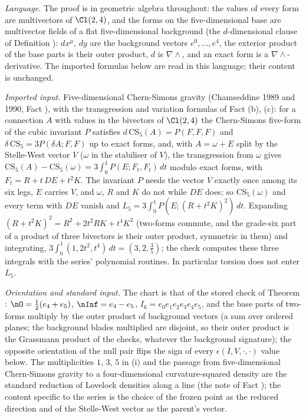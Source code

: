 \emph{Language.} The proof is in geometric algebra throughout: the values of every form are multivectors of $\Cl(2,4)$, and the forms on the five-dimensional base are multivector fields of a flat five-dimensional background (the $d$-dimensional clause of Definition ): $dx^{\mu}$, $dy$ are the background vectors $e^{0}, \dots, e^{4}$, the exterior product of the base parts is their outer product, $d$ is $\nabla \wedge$, and an exact form is a $\nabla \wedge$-derivative. The imported formulas below are read in this language; their content is unchanged.

\emph{Imported input.} Five-dimensional Chern-Simons gravity (Chamseddine 1989 and 1990, Fact ), with the transgression and variation formulas of Fact (b), (c): for a connection $A$ with values in the bivectors of $\Cl(2,4)$ the Chern-Simons five-form of the cubic invariant $P$ satisfies $d\,\mathrm{CS}_{5}(A) = P(F, F, F)$ and $\delta\,\mathrm{CS}_{5} = 3P(\delta A; F, F)$ up to exact forms, and, with $A = \omega + E$ split by the Stelle-West vector $V$ ($\omega$ in the stabiliser of $V$), the transgression from $\omega$ gives $\mathrm{CS}_{5}(A) - \mathrm{CS}_{5}(\omega) = 3\int_{0}^{1}P(E; F_{t}, F_{t})\,dt$ modulo exact forms, with $F_{t} = R + t\,DE + t^{2}K$. The invariant $P$ needs the vector $V$ exactly once among its six legs, $E$ carries $V$, and $\omega$, $R$ and $K$ do not while $DE$ does; so $\mathrm{CS}_{5}(\omega)$ and every term with $DE$ vanish and $L_{5} = 3\int_{0}^{1}P(E; (R + t^{2}K)^{2})\,dt$. Expanding $(R + t^{2}K)^{2} = R^{2} + 2t^{2}RK + t^{4}K^{2}$ (two-forms commute, and the grade-six part of a product of three bivectors is their outer product, symmetric in them) and integrating, $3\int_{0}^{1}(1, 2t^{2}, t^{4})\,dt = (3, 2, \tfrac35)$; the check computes these three integrals with the series' polynomial routines. In particular torsion does not enter $L_{5}$.

\emph{Orientation and standard input.} The chart is that of the stored check of Theorem : $\nO = \tfrac12(e_{4} + e_{5})$, $\nInf = e_{4} - e_{5}$, $I_{6} = e_{0}e_{1}e_{2}e_{3}e_{4}e_{5}$, and the base parts of two-forms multiply by the outer product of background vectors (a sum over ordered planes; the background blades multiplied are disjoint, so their outer product is the Grassmann product of the checks, whatever the background signature); the opposite orientation of the null pair flips the sign of every $\epsilon(I, V, \cdot, \cdot)$ value below. The multiplicities $1$, $3$, $5$ in (i) and the passage from five-dimensional Chern-Simons gravity to a four-dimensional curvature-squared density are the standard reduction of Lovelock densities along a line (the note of Fact ); the content specific to the series is the choice of the frozen point as the reduced direction and of the Stelle-West vector as the parent's vector.


